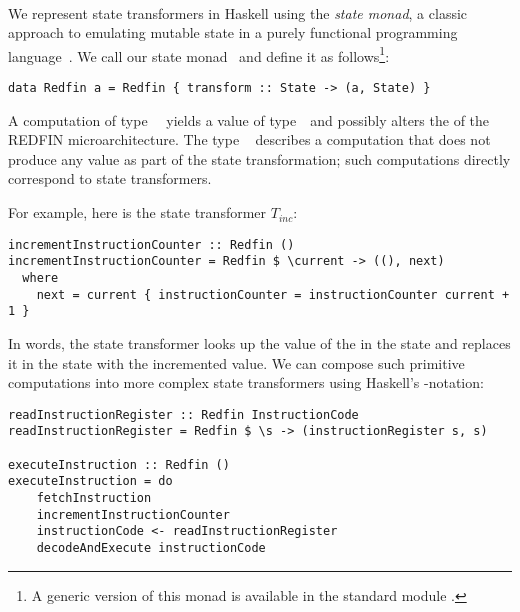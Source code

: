 
\vspace{-1mm}
\noindent\hrulefill~\\
\vspace{-3mm}

We represent state transformers in Haskell using the \emph{state monad}, a
classic approach to emulating mutable state in a purely functional programming
language~\cite{wadler1990comprehending}. We call our state monad~ and
define it as follows\footnote{A generic version of this monad is available in
the standard module .}:


\begin{verbatim}
data Redfin a = Redfin { transform :: State -> (a, State) }
\end{verbatim}


\noindent
A computation of type~~ yields a value of type~~and
possibly alters the  of the REDFIN microarchitecture.
The type ~\hs{()} describes a computation that does not produce any
value as part of the state transformation; such computations directly correspond
to state transformers.

\noindent
For example, here is the state transformer $T_\textit{inc}$:


\begin{verbatim}
incrementInstructionCounter :: Redfin ()
incrementInstructionCounter = Redfin $ \current -> ((), next)
  where
    next = current { instructionCounter = instructionCounter current + 1 }
\end{verbatim}


\noindent
In words, the state transformer looks up the value of the 
in the  state and replaces it in the  state with the
incremented value. We can compose such primitive computations into more complex
state transformers using Haskell's -notation:


\begin{verbatim}
readInstructionRegister :: Redfin InstructionCode
readInstructionRegister = Redfin $ \s -> (instructionRegister s, s)

executeInstruction :: Redfin ()
executeInstruction = do
    fetchInstruction
    incrementInstructionCounter
    instructionCode <- readInstructionRegister
    decodeAndExecute instructionCode
\end{verbatim}


